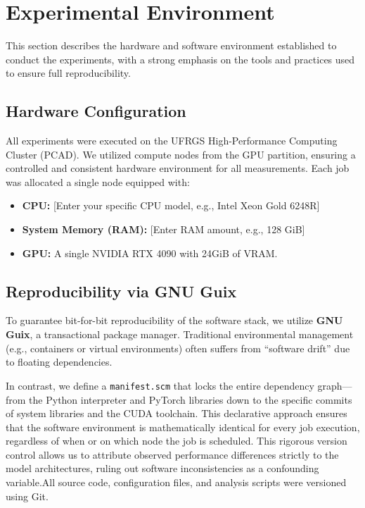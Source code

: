 \documentclass[acmsmall]{acmart}
\begin{document}
\section{Experimental Environment}

This section describes the hardware and software environment established to conduct the experiments, with a strong emphasis on the tools and practices used to ensure full reproducibility.


\subsection{Hardware Configuration}

All experiments were executed on the UFRGS High-Performance Computing Cluster (PCAD). We utilized compute nodes from the GPU partition, ensuring a controlled and consistent hardware environment for all measurements. Each job was allocated a single node equipped with:

\begin{itemize}
    \item \textbf{CPU:} [Enter your specific CPU model, e.g., Intel Xeon Gold 6248R]
    \item \textbf{System Memory (RAM):} [Enter RAM amount, e.g., 128 GiB]
    \item \textbf{GPU:} A single NVIDIA RTX 4090 with 24GiB of VRAM.
\end{itemize}

\subsection{Reproducibility via GNU Guix}

To guarantee bit-for-bit reproducibility of the software stack, we utilize \textbf{GNU Guix}, a transactional package manager. Traditional environmental management (e.g., containers or virtual environments) often suffers from ``software drift'' due to floating dependencies.

In contrast, we define a \texttt{manifest.scm} that locks the entire dependency graph—from the Python interpreter and PyTorch libraries down to the specific commits of system libraries and the CUDA toolchain. This declarative approach ensures that the software environment is mathematically identical for every job execution, regardless of when or on which node the job is scheduled. This rigorous version control allows us to attribute observed performance differences strictly to the model architectures, ruling out software inconsistencies as a confounding variable.All source code, configuration files, and analysis scripts were versioned using Git.
\end{document}
